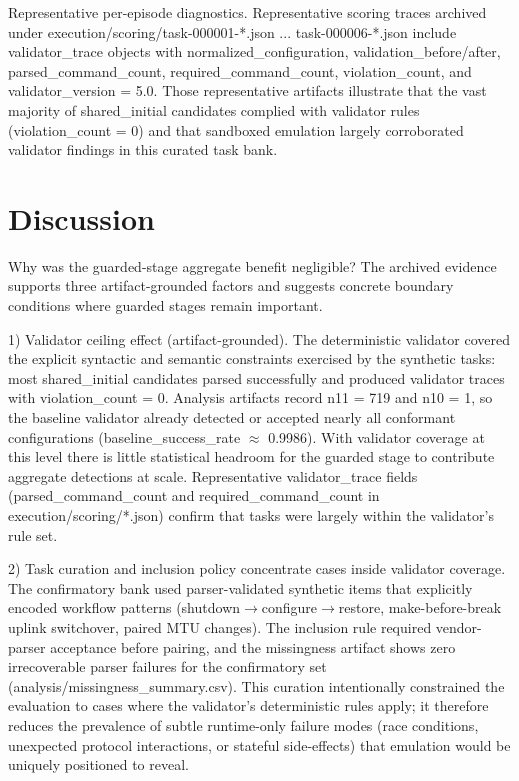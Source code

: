 \documentclass[conference]{IEEEtran}
\begin{document}
Representative per-episode diagnostics. Representative scoring traces archived under execution/scoring/task-000001-*.json ... task-000006-*.json include validator\_trace objects with normalized\_configuration, validation\_before/after, parsed\_command\_count, required\_command\_count, violation\_count, and validator\_version = 5.0. Those representative artifacts illustrate that the vast majority of shared\_initial candidates complied with validator rules (violation\_count = 0) and that sandboxed emulation largely corroborated validator findings in this curated task bank.

\section{Discussion}
Why was the guarded-stage aggregate benefit negligible? The archived evidence supports three artifact-grounded factors and suggests concrete boundary conditions where guarded stages remain important.

1) Validator ceiling effect (artifact-grounded). The deterministic validator covered the explicit syntactic and semantic constraints exercised by the synthetic tasks: most shared\_initial candidates parsed successfully and produced validator traces with violation\_count = 0. Analysis artifacts record n11 = 719 and n10 = 1, so the baseline validator already detected or accepted nearly all conformant configurations (baseline\_success\_rate \ensuremath{\approx} 0.9986). With validator coverage at this level there is little statistical headroom for the guarded stage to contribute aggregate detections at scale. Representative validator\_trace fields (parsed\_command\_count and required\_command\_count in execution/scoring/*.json) confirm that tasks were largely within the validator's rule set.

2) Task curation and inclusion policy concentrate cases inside validator coverage. The confirmatory bank used parser-validated synthetic items that explicitly encoded workflow patterns (shutdown\ensuremath{\rightarrow}configure\ensuremath{\rightarrow}restore, make-before-break uplink switchover, paired MTU changes). The inclusion rule required vendor-parser acceptance before pairing, and the missingness artifact shows zero irrecoverable parser failures for the confirmatory set (analysis/missingness\_summary.csv). This curation intentionally constrained the evaluation to cases where the validator's deterministic rules apply; it therefore reduces the prevalence of subtle runtime-only failure modes (race conditions, unexpected protocol interactions, or stateful side-effects) that emulation would be uniquely positioned to reveal.
\end{document}
